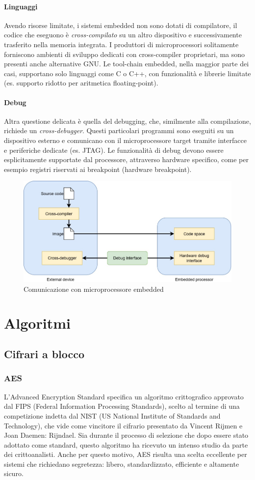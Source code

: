 \documentclass[target=bach,aauheader=,style=]{thud}
\begin{document}
    		\subsubsection{Linguaggi}
    		Avendo risorse limitate, i sistemi embedded non sono dotati di compilatore, il codice che eseguono è \textit{cross-compilato} su un altro dispositivo e successivamente trasferito nella memoria integrata. I produttori di microprocessori solitamente forniscono ambienti di sviluppo dedicati con cross-compiler proprietari, ma sono presenti anche alternative GNU.
    		Le tool-chain embedded, nella maggior parte dei casi, supportano solo linguaggi come C o C++, con funzionalità e librerie limitate (es. supporto ridotto per aritmetica floating-point).
			\subsubsection{Debug}
			Altra questione delicata è quella del debugging, che, similmente alla compilazione, richiede un \textit{cross-debugger}. Questi particolari programmi sono eseguiti su un dispositivo esterno e comunicano con il microprocessore target tramite interfacce e periferiche dedicate (es. JTAG).
			Le funzionalità di debug devono essere esplicitamente supportate dal processore, attraverso hardware specifico, come per esempio registri riservati ai breakpoint (hardware breakpoint).
			
			\begin{figure}[h]
				\centering
				\includegraphics[width=0.5\linewidth]{img/cross-compiler-debugger.jpg}
				\caption{Comunicazione con microprocessore embedded}
				\label{fig:mcucomm}
			\end{figure}
			    		
\chapter{Algoritmi}
	\section{Cifrari a blocco}
		\subsection{AES}\cite{aes}
		L'Advanced Encryption Standard specifica un algoritmo crittografico approvato dal FIPS (Federal Information Processing Standards), scelto al termine di una competizione indetta dal NIST (US National Institute of Standards and Technology), che vide come vincitore il cifrario presentato da Vincent Rijmen e Joan Daemen: Rijndael. Sia durante il processo di selezione che dopo essere stato adottato come standard, questo algoritmo ha ricevuto un intenso studio da parte dei crittoanalisti. Anche per questo motivo, AES risulta una scelta eccellente per sistemi che richiedano segretezza: libero, standardizzato, efficiente e altamente sicuro. \cite{moderncrypto}
\end{document}
